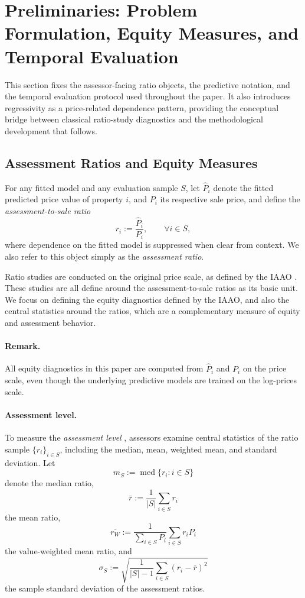 \documentclass[12pt, draft]{article}
\theoremstyle{plain}
\theoremstyle{definition}
\newcommand{\1}{\mathbf{1}}
\begin{document}
{
\section{Preliminaries: Problem Formulation, Equity Measures, and Temporal Evaluation}
\label{sec:problem_setting}

This section fixes the assessor-facing ratio objects, the predictive notation, and the temporal evaluation protocol used throughout the paper. It also introduces regressivity as a price-related dependence pattern, providing the conceptual bridge between classical ratio-study diagnostics and the methodological development that follows.

\subsection{Assessment Ratios and Equity Measures}
\label{subsec:equity_metrics}

For any fitted model and any evaluation sample $S$, let $\widehat P_i$ denote the fitted predicted price value of property $i$, and $P_i$ its respective sale price, and define the \emph{assessment-to-sale ratio}
\begin{equation}
\label{eq:ratio_def}
r_i := \frac{\widehat P_i}{P_i},
\qquad \forall i\in S,
\end{equation}
where dependence on the fitted model is suppressed when clear from context. We also refer to this object simply as the \textit{assessment ratio}.

Ratio studies are conducted on the original price scale, as defined by the IAAO \cite{IAAO2025ExposureRatio}. These studies are all define around the assessment-to-sale ratios as its basic unit. We focus on defining the equity diagnostics defined by the IAAO, and also the central statistics around the ratios, which are a complementary measure of equity and assessment behavior. 

\paragraph{Remark.} All equity diagnostics in this paper are computed from $\widehat P_i$ and $P_i$ on the price scale, even though the underlying predictive models are trained on the log-prices scale.

\paragraph{Assessment level.}
To measure the \textit{assessment level} \cite{IAAO2025ExposureRatio}, assessors examine central statistics of the ratio sample $\{r_i\}_{i\in S}$, including the median, mean, weighted mean, and standard deviation. Let
\[
m_S := \operatorname{med}\{r_i: i\in S\}
\]
denote the median ratio,
\[
\bar r := \frac{1}{|S|}\sum_{i\in S} r_i
\]
the mean ratio,
\[
\overline{r_W} := \frac{1}{\sum_{i\in S} P_i}\sum_{i\in S} r_i P_i
\]
the value-weighted mean ratio, and
\[
\sigma_S := \sqrt{\frac{1}{|S|-1}\sum_{i\in S}(r_i-\bar r)^2}
\]
the sample standard deviation of the assessment ratios.

}
\end{document}
